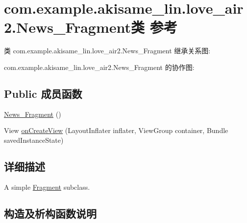 \hypertarget{classcom_1_1example_1_1akisame__lin_1_1love__air2_1_1_news___fragment}{}\section{com.\+example.\+akisame\+\_\+lin.\+love\+\_\+air2.\+News\+\_\+\+Fragment类 参考}
\label{classcom_1_1example_1_1akisame__lin_1_1love__air2_1_1_news___fragment}


类 com.\+example.\+akisame\+\_\+lin.\+love\+\_\+air2.\+News\+\_\+\+Fragment 继承关系图\+:


com.\+example.\+akisame\+\_\+lin.\+love\+\_\+air2.\+News\+\_\+\+Fragment 的协作图\+:
\subsection*{Public 成员函数}
\begin{DoxyCompactItemize}
\item 
\mbox{\hyperlink{classcom_1_1example_1_1akisame__lin_1_1love__air2_1_1_news___fragment_af605939ebe82a09656ab7b3970f767ee}{News\+\_\+\+Fragment}} ()
\item 
View \mbox{\hyperlink{classcom_1_1example_1_1akisame__lin_1_1love__air2_1_1_news___fragment_aaac54952ce880bd19f413033e0b5255d}{on\+Create\+View}} (Layout\+Inflater inflater, View\+Group container, Bundle saved\+Instance\+State)
\end{DoxyCompactItemize}


\subsection{详细描述}
A simple \mbox{\hyperlink{}{Fragment}} subclass. 

\subsection{构造及析构函数说明}
\mbox{\label{classcom_1_1example_1_1akisame__lin_1_1love__air2_1_1_news___fragment_af605939ebe82a09656ab7b3970f767ee}} 
